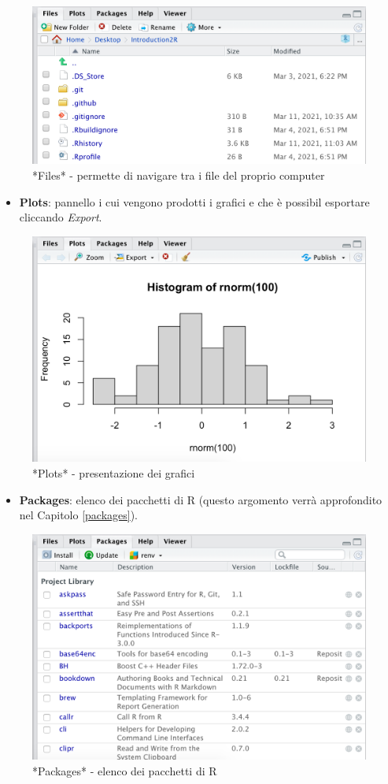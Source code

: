 \documentclass[
]{book}
\providecommand{\tightlist}{%
  \setlength{\itemsep}{0pt}\setlength{\parskip}{0pt}}
\begin{document}
\begin{figure}

{\centering \includegraphics[width=0.6\linewidth]{images/files} 

}

\caption{*Files* - permette di navigare tra i file del proprio computer}\label{fig:files}
\end{figure}

\begin{itemize}
\tightlist
\item
  \textbf{Plots}: pannello i cui vengono prodotti i grafici e che è possibil esportare cliccando \emph{Export}.
\end{itemize}

\begin{figure}

{\centering \includegraphics[width=0.6\linewidth]{images/plots} 

}

\caption{*Plots* - presentazione dei grafici}\label{fig:plots}
\end{figure}

\begin{itemize}
\tightlist
\item
  \textbf{Packages}: elenco dei pacchetti di R (questo argomento verrà approfondito nel Capitolo \ref{packages}).
\end{itemize}

\begin{figure}

{\centering \includegraphics[width=0.6\linewidth]{images/packages} 

}

\caption{*Packages* - elenco dei pacchetti di R}\label{fig:packages}
\end{figure}
\end{document}
